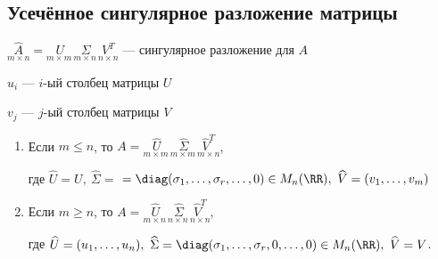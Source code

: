 \subsection{Усечённое сингулярное разложение матрицы}


$\underset{\scriptscriptstyle{m \times n}}{\widehat{A}} = \underset{\scriptscriptstyle{m \times m \ }}{U} \underset{\scriptscriptstyle{m \times n \ }}{\Sigma} \underset{\scriptscriptstyle{n \times n}}{V^T}$ --- сингулярное разложение для $A$

$u_i$ --- $i$-ый столбец матрицы $U$

$v_j$ --- $j$-ый столбец матрицы $V$

\begin{proposal}
    \begin{enumerate}
        \item Если $m \leq n$, то $A = \underset{\scriptscriptstyle{m \times m \ }}{\widehat{U}} \underset{\scriptscriptstyle{m \times m \ }}{\widehat{\Sigma}} \underset{\scriptscriptstyle{m \times n}}{\widehat{V}^T}$, 
        
        где  $\widehat{U} = U, \ \widehat{\Sigma} = $
        $ = \diag(\sigma_1, \dots, \sigma_r, \dots, 0) \in M_n(\RR), \ \widehat{V} = (v_1, \dots, v_m) $
        \item Если $m \geq n$, то $A = \underset{\scriptscriptstyle{m \times n \ }}{\widehat{U}} \underset{\scriptscriptstyle{n \times n \ }}{\widehat{\Sigma}} \underset{\scriptscriptstyle{n \times n}}{\widehat{V}^T}$,
        
        где $\widehat{U} = (u_1, \dots, u_n), \ \widehat{\Sigma} = \diag(\sigma_1, \dots, \sigma_r, 0, \dots, 0) \in M_n(\RR), \ \widehat{V} = V $.
    \end{enumerate}

\end{proposal}


